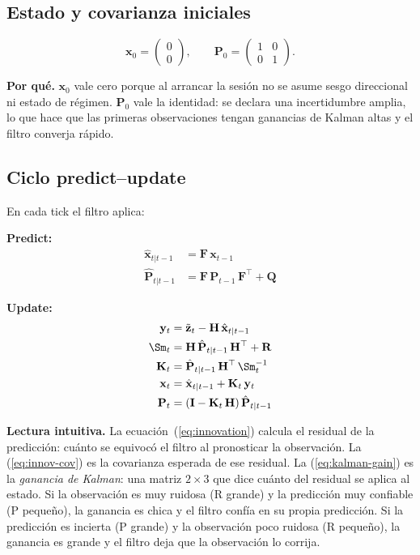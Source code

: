 \documentclass[journal,onecolumn,11pt]{IEEEtran}
\newcommand{\xv}{\mathbf{x}}
\newcommand{\zv}{\mathbf{z}}
\newcommand{\Fm}{\mathbf{F}}
\newcommand{\Hm}{\mathbf{H}}
\newcommand{\Qm}{\mathbf{Q}}
\newcommand{\Rm}{\mathbf{R}}
\newcommand{\Pm}{\mathbf{P}}
\newcommand{\Km}{\mathbf{K}}
\newcommand{\Iv}{\mathbf{I}}
\begin{document}
\subsection{Estado y covarianza iniciales}

\begin{equation}
\xv_0 = \begin{pmatrix}0\\0\end{pmatrix},\qquad
\Pm_0 = \begin{pmatrix}1 & 0 \\ 0 & 1\end{pmatrix}.
\label{eq:initial}
\end{equation}

\noindent
\textbf{Por qué.}
$\xv_0$ vale cero porque al arrancar la sesión no se asume sesgo
direccional ni estado de régimen. $\Pm_0$ vale la identidad: se
declara una incertidumbre amplia, lo que hace que las primeras
observaciones tengan ganancias de Kalman altas y el filtro converja
rápido.

\subsection{Ciclo predict--update}

En cada tick el filtro aplica:

\medskip
\noindent
\textbf{Predict:}
\begin{align}
\hat{\xv}_{t|t-1} &= \Fm\,\xv_{t-1} \label{eq:predict-x}\\
\hat{\Pm}_{t|t-1} &= \Fm\,\Pm_{t-1}\,\Fm^\top + \Qm \label{eq:predict-P}
\end{align}

\medskip
\noindent
\textbf{Update:}
\begin{align}
\mathbf{y}_t &= \tilde{\zv}_t - \Hm\,\hat{\xv}_{t|t-1} \label{eq:innovation}\\
\Sm_t &= \Hm\,\hat{\Pm}_{t|t-1}\,\Hm^\top + \Rm \label{eq:innov-cov}\\
\Km_t &= \hat{\Pm}_{t|t-1}\,\Hm^\top\,\Sm_t^{-1} \label{eq:kalman-gain}\\
\xv_t &= \hat{\xv}_{t|t-1} + \Km_t\,\mathbf{y}_t \label{eq:posterior-x}\\
\Pm_t &= (\Iv - \Km_t\,\Hm)\,\hat{\Pm}_{t|t-1} \label{eq:posterior-P}
\end{align}

\medskip
\noindent
\textbf{Lectura intuitiva.}
La ecuación~(\ref{eq:innovation}) calcula el residual de la
predicción: cuánto se equivocó el filtro al pronosticar la observación.
La (\ref{eq:innov-cov}) es la covarianza esperada de ese residual.
La (\ref{eq:kalman-gain}) es la \emph{ganancia de Kalman}: una matriz
$2\!\times\!3$ que dice cuánto del residual se aplica al estado.
Si la observación es muy ruidosa (R grande) y la predicción muy
confiable (P pequeño), la ganancia es chica y el filtro confía en su
propia predicción. Si la predicción es incierta (P grande) y la
observación poco ruidosa (R pequeño), la ganancia es grande y el
filtro deja que la observación lo corrija.
\end{document}
